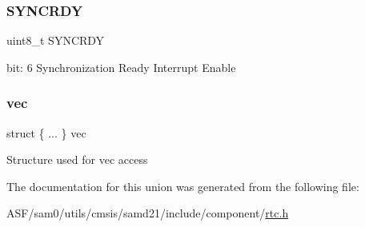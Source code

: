 \subsubsection{\texorpdfstring{SYNCRDY}{SYNCRDY}}
{\footnotesize\ttfamily uint8\+\_\+t S\+Y\+N\+C\+R\+DY}

bit\+: 6 Synchronization Ready Interrupt Enable \mbox{\label{union_r_t_c___m_o_d_e1___i_n_t_e_n_s_e_t___type_a20ad956f76dddcf62ec972c34a8ff8ea}} 
\subsubsection{\texorpdfstring{vec}{vec}}
{\footnotesize\ttfamily struct \{ ... \}   vec}

Structure used for vec access 

The documentation for this union was generated from the following file\+:\begin{DoxyCompactItemize}
\item 
A\+S\+F/sam0/utils/cmsis/samd21/include/component/\mbox{\hyperlink{component_2rtc_8h}{rtc.\+h}}\end{DoxyCompactItemize}
